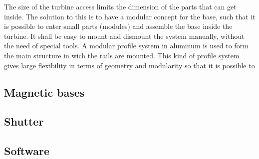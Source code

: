The size of the turbine access limits the dimension of the parts that can get
inside. The solution to this is to have a modular concept for the base, such
that it is possible to enter small parts (modules) and assemble the base inside
the turbine. It shall be easy to mount and dismount the system manually, without
the need of special tools. A modular profile system in aluminum is used to form
the main structure in wich the rails are mounted. This kind of profile system
gives large flexibility in terms of geometry and modularity so that it is
possible to 




\subsection{Magnetic bases}

\subsection{Shutter}

\subsection{Software}